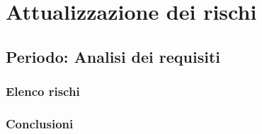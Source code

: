 \section{Attualizzazione dei rischi}
\subsection{Periodo: Analisi dei requisiti}
\subsubsection{Elenco rischi}
\subsubsection{Conclusioni}
